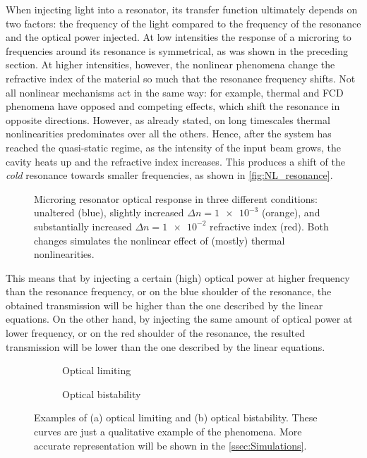 When injecting light into a resonator, its transfer function ultimately depends on two factors: the frequency of the light compared to the frequency of the resonance and the optical power injected.
At low intensities the response of a microring to frequencies around its resonance is symmetrical, as was shown in the preceding section.
At higher intensities, however, the nonlinear phenomena change the refractive index of the material so much that the resonance frequency shifts.
Not all nonlinear mechanisms act in the same way: for example, thermal and FCD phenomena have opposed and competing effects, which shift the resonance in opposite directions.
However, as already stated, on long timescales thermal nonlinearities predominates over all the others.
Hence, after the system has reached the quasi-static regime, as the intensity of the input beam grows, the cavity heats up and the refractive index increases.
This produces a shift of the \textit{cold} resonance towards smaller frequencies, as shown in \autoref{fig:NL_resonance}.

\begin{figure}[hbtp]
	\centering
	
	\caption{Microring resonator optical response in three different conditions: unaltered (blue), slightly increased $\Delta n=\num{1e-3}$ (orange), and substantially increased $\Delta n=\num{1e-2}$ refractive index (red).
	Both changes simulates the nonlinear effect of (mostly) thermal nonlinearities.}
	\label{fig:NL_resonance}
\end{figure}

This means that by injecting a certain (high) optical power at higher frequency than the resonance frequency, or on the blue shoulder of the resonance, the obtained transmission will be higher than the one described by the linear equations.
On the other hand, by injecting the same amount of optical power at lower frequency, or on the red shoulder of the resonance, the resulted transmission will be lower than the one described by the linear equations.

\begin{figure}[htbp]
	\begin{subfigure}[b]{0.49\textwidth}
		\centering
		
		\caption{Optical limiting}
		\label{fig:optical_limiting_example}
  \end{subfigure}
  \begin{subfigure}[b]{0.49\textwidth}
  		\centering
		
		\caption{Optical bistability}
		\label{fig:bistability_example}
  \end{subfigure}
  \caption{
		Examples of (a) optical limiting and (b) optical bistability.
		These curves are just a qualitative example of the phenomena.
		More accurate representation will be shown in the \autoref{ssec:Simulations}.
  }
  	\label{fig:nonlinear_examples}
\end{figure}

